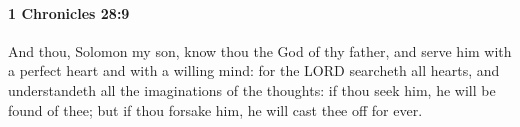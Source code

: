 
		\paragraph{1 Chronicles 28:9} %
			\label{1CHRONICLES-28-9}

			And thou, Solomon my son, know thou the God of thy father, and serve him with a perfect heart and with a willing mind: for the LORD searcheth all hearts, and understandeth all the imaginations of the thoughts: if thou seek him, he will be found of thee; but if thou forsake him, he will cast thee off for ever.



